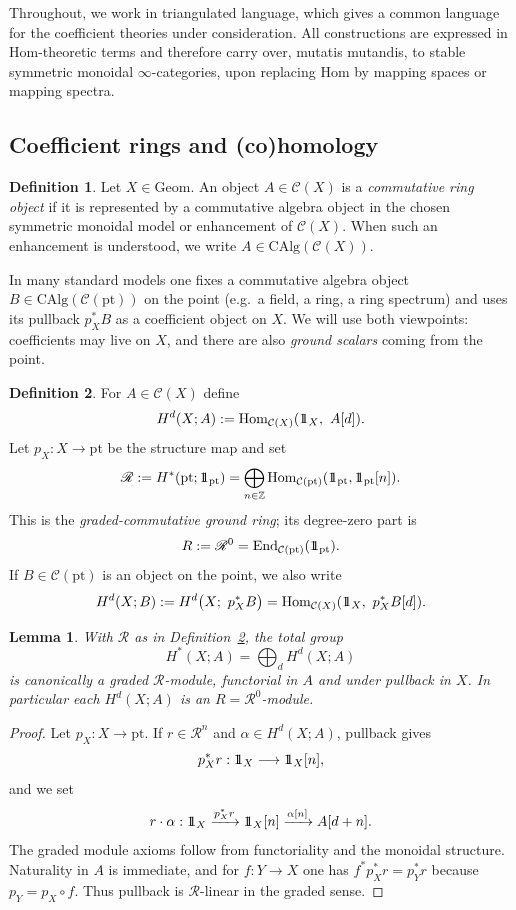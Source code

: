 \documentclass[10pt,a4paper,dvipsnames,x11names]{amsart}
\newcommand{\one}{1\hskip-3.5pt1}
\newcommand{\C}{\mathcal C}
\newcommand{\Geom}{\mathrm{Geom}}
\newcommand{\pt}{\mathrm{pt}}
\newcommand{\Hom}{\mathrm{Hom}}
\newcommand{\End}{\mathrm{End}}
\numberwithin{equation}{section}
\theoremstyle{plain}
\newtheorem{lemma}[lemma]{Lemma}
\theoremstyle{definition}
\newtheorem{definition}[definition]{Definition}
\theoremstyle{remark}
\begin{document}
Throughout, we work in triangulated language, which gives a common language for the coefficient theories under consideration. All constructions are expressed in Hom-theoretic terms and therefore carry over, mutatis mutandis, to stable symmetric monoidal $\infty$-categories, upon replacing $\Hom$ by mapping spaces or mapping spectra.
 
\subsection{Coefficient rings and (co)homology}

\begin{definition}\label{def:ringobj}
Let $X\in\Geom$. An object $A\in\C(X)$ is a \emph{commutative ring object} if it is represented by a commutative algebra object in the chosen symmetric monoidal model or enhancement of $\C(X)$.  When such an enhancement is understood, we write $A\in \mathrm{CAlg}(\C(X))$.

\smallskip
In many standard models one fixes a commutative algebra object $B\in \mathrm{CAlg}(\C(\pt))$ on the point
(e.g.\ a field, a ring, a ring spectrum) and uses its pullback $p_X^*B$ as a coefficient object on $X$.
We will use both viewpoints: coefficients may live on $X$, and there are also \emph{ground scalars} coming from the point.
\end{definition}

\begin{definition}\label{def:coh}
For $A\in\C(X)$ define
$$
H^d(X;A):=\Hom_{\C(X)}(\one_X,\ A[d]).
$$
Let $p_X:X\to \pt$ be the structure map and set
\[
\mathscr R:=H^*(\pt;\one_{\pt})
=\bigoplus_{n\in\mathbb Z}\Hom_{\C(\pt)}(\one_{\pt},\one_{\pt}[n]).
\]
This is the \emph{graded-commutative ground ring}; its degree-zero part is
\[
R:=\mathscr R^0=\End_{\C(\pt)}(\one_{\pt}).
\]
If $B\in\C(\pt)$ is an object on the point, we also write
$$
H^d(X;B):=H^d\big(X;\ p_X^*B\big)=\Hom_{\C(X)}(\one_X,\ p_X^*B[d]).
$$
\end{definition}

\begin{lemma}\label{lem:R-action}
With $\mathscr R$ as in Definition~\ref{def:coh}, the total group
\[
H^*(X;A)=\bigoplus_d H^d(X;A)
\]
is canonically a graded $\mathscr R$-module, functorial in $A$ and under pullback in $X$.  In particular each $H^d(X;A)$ is an $R=\mathscr R^0$-module.
\end{lemma}

\begin{proof}
Let $p_X:X\to\pt$.  If $r\in\mathscr R^n$ and $\alpha\in H^d(X;A)$, pullback gives
\[
p_X^*r:\one_X\longrightarrow\one_X[n],
\]
and we set
\[
r\cdot\alpha:
\one_X\xrightarrow{p_X^*r}\one_X[n]
\xrightarrow{\alpha[n]}A[d+n].
\]
The graded module axioms follow from functoriality and the monoidal structure.  Naturality in $A$ is immediate, and for $f:Y\to X$ one has $f^*p_X^*r=p_Y^*r$ because $p_Y=p_X\circ f$.  Thus pullback is $\mathscr R$-linear in the graded sense.
\end{proof}
\end{document}
